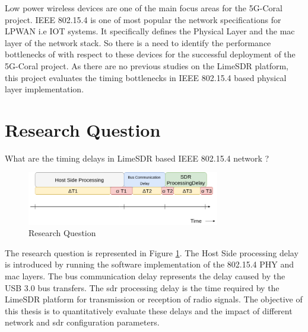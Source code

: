 Low power wireless devices are one of the main focus areas for the 5G-Coral project.
IEEE 802.15.4 is one of most popular the network specifications for \ac{LPWAN} i.e \ac{IOT} systems.
It specifically defines the Physical Layer and the \ac{mac} layer of the network stack.
So there is a need to identify the performance bottlenecks of with respect to these devices for the successful deployment of the 5G-Coral project.
As there are no previous studies on the LimeSDR platform, this project evaluates the timing bottlenecks in IEEE 802.15.4 based physical layer implementation.









\section{Research Question}
What are the timing delays in  LimeSDR based IEEE 802.15.4 network ?
\begin{figure}[!h]
\centering
\includegraphics[width=0.75\textwidth]{Figure/RQ1.png}
\caption{Research Question}
\label{rq1}
\end{figure}

The research question is represented in Figure \ref{rq1}.
The Host Side processing delay is introduced by running the software implementation of the 802.15.4 \ac{PHY} and \ac{mac} layers.
The bus communication delay represents the delay caused by the \ac{USB} 3.0 bus transfers.
The \ac{sdr} processing delay is the time required by the LimeSDR platform for transmission or reception of radio signals.
The objective of this thesis is to quantitatively evaluate these delays and the impact of different network and \ac{sdr} configuration parameters.

